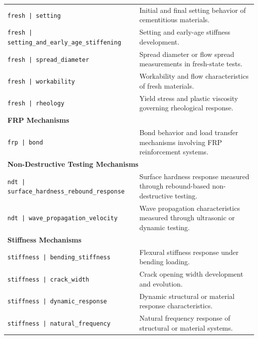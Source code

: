 \documentclass[11pt]{book}
\begin{document}
{\begin{longtable}{p{}p{}}
\texttt{fresh | setting} &
Initial and final setting behavior of cementitious materials. \\

\texttt{fresh | setting\_and\_early\_age\_stiffening} &
Setting and early-age stiffness development. \\

\texttt{fresh | spread\_diameter} &
Spread diameter or flow spread measurements in fresh-state tests. \\

\texttt{fresh | workability} &
Workability and flow characteristics of fresh materials. \\

\texttt{fresh | rheology} &
Yield stress and plastic viscosity governing rheological response. \\

\hline
\multicolumn{2}{l}{\textbf{FRP Mechanisms}}\\
\hline

\texttt{frp | bond} &
Bond behavior and load transfer mechanisms involving FRP reinforcement systems. \\

\hline
\multicolumn{2}{l}{\textbf{Non-Destructive Testing Mechanisms}}\\
\hline

\texttt{ndt | surface\_hardness\_rebound\_response} &
Surface hardness response measured through rebound-based non-destructive testing. \\

\texttt{ndt | wave\_propagation\_velocity} &
Wave propagation characteristics measured through ultrasonic or dynamic testing. \\

\hline
\multicolumn{2}{l}{\textbf{Stiffness Mechanisms}}\\
\hline

\texttt{stiffness | bending\_stiffness} &
Flexural stiffness response under bending loading. \\

\texttt{stiffness | crack\_width} &
Crack opening width development and evolution. \\

\texttt{stiffness | dynamic\_response} &
Dynamic structural or material response characteristics. \\

\texttt{stiffness | natural\_frequency} &
Natural frequency response of structural or material systems. \\


\end{longtable}}
\end{document}
